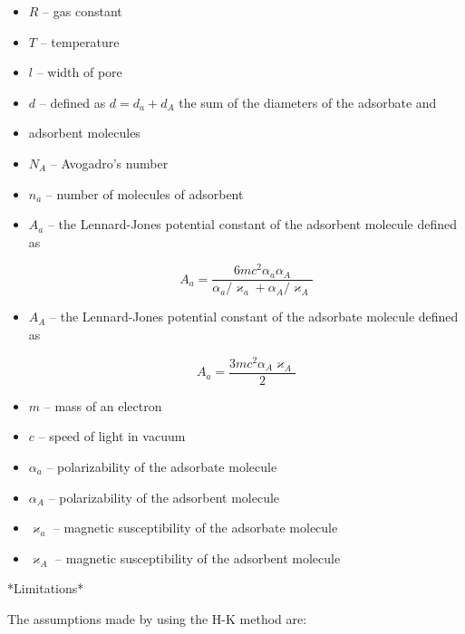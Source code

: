 \begin{itemize}
    
    \item \(R\) -- gas constant
    \item \(T\) -- temperature
    \item \(l\) -- width of pore
    \item \(d\) -- defined as \(d=d_a+d_A\) the sum of the diameters of the adsorbate and
    \item adsorbent molecules
    \item \(N_A\) -- Avogadro's number
    \item \(n_a\) -- number of molecules of adsorbent
    \item \(A_a\) -- the Lennard-Jones potential constant of the adsorbent molecule defined as
    
        \begin{equation}
            A_a = \frac{6mc^2\alpha_a\alpha_A}{\alpha_a/\varkappa_a + \alpha_A/\varkappa_A}
        \end{equation}
        
    \item \(A_A\) -- the Lennard-Jones potential constant of the adsorbate molecule defined as
    
    \begin{equation}
            A_a = \frac{3mc^2\alpha_A\varkappa_A}{2}
    \end{equation}
        
    \item \(m\) -- mass of an electron
    \item \(c\) -- speed of light in vacuum
    \item \(\alpha_a\) -- polarizability of the adsorbate molecule
    \item \(\alpha_A\) -- polarizability of the adsorbent molecule
    \item \(\varkappa_a\) -- magnetic susceptibility of the adsorbate molecule
    \item \(\varkappa_A\) -- magnetic susceptibility of the adsorbent molecule
    
\end{itemize}

*Limitations*

The assumptions made by using the H-K method are:

